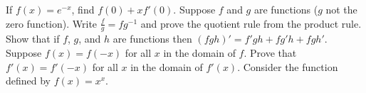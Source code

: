 \begin{questions}
\begin{multicols}{2}
    \end{multicols}
  \questioA If $ f(x) = e^{-x} $, find $ f(0) + xf'(0) $.
  \questioM Suppose $ f $ and $ g $ are functions ($ g $ not the zero function). Write $ \frac{f}{g} = fg^{-1} $ and
            prove the quotient rule from the product rule.
  \questioM Show that if $ f $, $ g $, and $ h $ are functions then $ (fgh)' = f'gh + fg'h + fgh' $.
  \questioE Suppose $ f(x) = f(-x) $ for all $ x $ in the domain of $ f $. Prove that $ f'(x) = f'(-x) $ for all $ x $
            in the domain of $ f'(x) $.
  \questioE Consider the function defined by $ f(x) = x^x $.
\end{questions}
